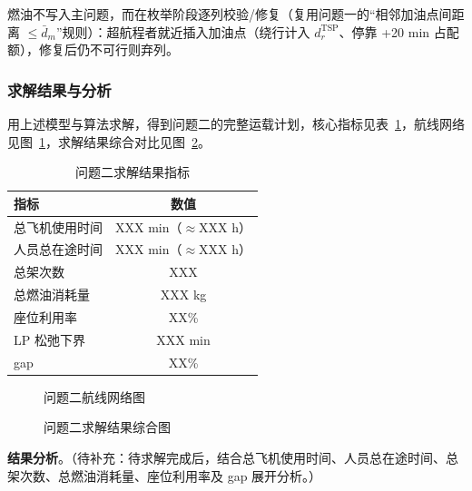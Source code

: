 \documentclass[UTF8,zihao=-4]{ctexart}
\numberwithin{figure}{section}
\numberwithin{table}{section}
\begin{document}
燃油不写入主问题，而在枚举阶段逐列校验/修复（复用问题一的“相邻加油点间距离 $\le\bar{d}_m$”规则）：超航程者就近插入加油点（绕行计入 $d_r^{\mathrm{TSP}}$、停靠 +20 min 占配额），修复后仍不可行则弃列。

\subsubsection{求解结果与分析}

用上述模型与算法求解，得到问题二的完整运载计划，核心指标见表~\ref{tab:q2_result}，航线网络见图~\ref{fig:q2_network}，求解结果综合对比见图~\ref{fig:q2_result}。

\begin{table}[H]
  \centering
  \caption{问题二求解结果指标}
  \label{tab:q2_result}
  \begin{tabular}{lc}
    \toprule
    指标 & 数值 \\
    \midrule
    总飞机使用时间 & XXX min（$\approx$XXX h） \\
    人员总在途时间 & XXX min（$\approx$XXX h） \\
    总架次数 & XXX \\
    总燃油消耗量 & XXX kg \\
    座位利用率 & XX\% \\
    \midrule
    LP 松弛下界 & XXX min \\
    gap & XX\% \\
    \bottomrule
  \end{tabular}
\end{table}

\begin{figure}[H]
  \centering
  \caption{问题二航线网络图}
  \label{fig:q2_network}
\end{figure}

\begin{figure}[H]
  \centering
  \caption{问题二求解结果综合图}
  \label{fig:q2_result}
\end{figure}

\textbf{结果分析}。（待补充：待求解完成后，结合总飞机使用时间、人员总在途时间、总架次数、总燃油消耗量、座位利用率及 gap 展开分析。）
\end{document}
